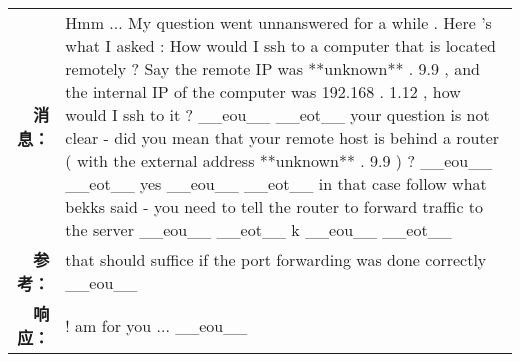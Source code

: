 \begin{tabularx}{0.8\textwidth}{@{}rX@{}}%
\toprule%
\midrule%
\textbf{消息：}&Hmm ... My question went unnanswered for a while . Here 's what I asked : How would I ssh to a computer that is located remotely ? Say the remote IP was **unknown** . 9.9 , and the internal IP of the computer was 192.168 . 1.12 , how would I ssh to it ? \_\_eou\_\_ \_\_eot\_\_ your question is not clear {-} did you mean that your remote host is behind a router ( with the external address **unknown** . 9.9 ) ? \_\_eou\_\_ \_\_eot\_\_ yes \_\_eou\_\_ \_\_eot\_\_ in that case follow what bekks said {-} you need to tell the router to forward traffic to the server \_\_eou\_\_ \_\_eot\_\_ k \_\_eou\_\_ \_\_eot\_\_\\%
\textbf{参考：}&that should suffice if the port forwarding was done correctly \_\_eou\_\_\\%
\textbf{响应：}&! am for you ... \_\_eou\_\_\\%
\midrule%

\end{tabularx}
